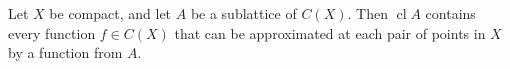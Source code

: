Let $X$ be compact, and let $A$ be a sublattice of $C(X)$. Then $\operatorname{cl} A$ contains every function $f \in C(X)$ that can be approximated at each pair of points in $X$ by a function from $A$.
